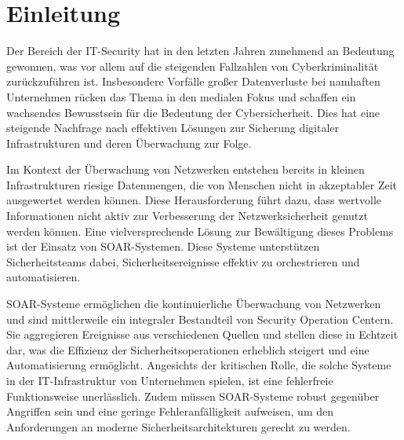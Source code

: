 \section{Einleitung}
Der Bereich der IT-Security hat in den letzten Jahren zunehmend an Bedeutung gewonnen, was vor allem auf die steigenden Fallzahlen von Cyberkriminalität zurückzuführen ist. Insbesondere Vorfälle großer Datenverluste bei namhaften Unternehmen rücken das Thema in den medialen Fokus und schaffen ein wachsendes Bewusstsein für die Bedeutung der Cybersicherheit. Dies hat eine steigende Nachfrage nach effektiven Lösungen zur Sicherung digitaler Infrastrukturen und deren Überwachung zur Folge.

Im Kontext der Überwachung von Netzwerken entstehen bereits in kleinen Infrastrukturen riesige Datenmengen, die von Menschen nicht in akzeptabler Zeit ausgewertet werden können. Diese Herausforderung führt dazu, dass wertvolle Informationen nicht aktiv zur Verbesserung der Netzwerksicherheit genutzt werden können. Eine vielversprechende Lösung zur Bewältigung dieses Problems ist der Einsatz von \ac{SOAR}-Systemen. Diese Systeme unterstützen Sicherheitsteams dabei, Sicherheitsereignisse effektiv zu orchestrieren und automatisieren.

\ac{SOAR}-Systeme ermöglichen \cite{PICUS.2023} die kontinuierliche Überwachung von Netzwerken und sind mittlerweile ein integraler Bestandteil von Security Operation Centern. Sie aggregieren Ereignisse aus verschiedenen Quellen und stellen diese in Echtzeit dar, was die Effizienz der Sicherheitsoperationen erheblich steigert und eine Automatisierung ermöglicht. Angesichts der kritischen Rolle, die solche Systeme in der IT-Infrastruktur von Unternehmen spielen, ist eine fehlerfreie Funktionsweise unerlässlich. Zudem müssen \ac{SOAR}-Systeme robust gegenüber Angriffen sein und eine geringe Fehleranfälligkeit aufweisen, um den Anforderungen an moderne Sicherheitsarchitekturen gerecht zu werden.

